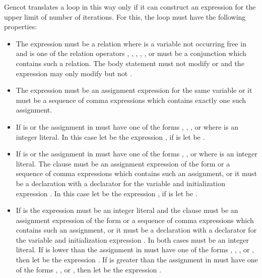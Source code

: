 Gencot translates a loop  in this way only if it can construct an expression  for the upper limit of
number of iterations. For this, the loop must have the following properties:
\begin{itemize}
\item The expression  must be a relation  where  is a variable not occurring free in 
and  is one of the relation operators \code{<}, \code{<=}, \code{>}, \code{>=}, \code{!=}, or  must be a 
conjunction which contains such a relation. The body statement  must not modify  or  and the expression 
 may only modify  but not .
\item The expression  must be an assignment expression for the same variable  or it must be a sequence of 
comma expressions which contains exactly one such assignment.
\item If  is \code{<} or \code{<=} the assignment in  must have one of the forms , ,
, or  where  is an integer literal. In this case let  be the expression ,
if  is \code{<=} let  be .
\item If  is \code{>} or \code{>=} the assignment in  must have one of the forms , ,
or  where  is an integer literal. The clause  must be an assignment expression of the form 
 or a sequence of comma expressions which contains such an assignment, or it must be a declaration with a declarator 
for the variable  and initialization expression . In this case let  be the expression ,
if  is \code{>=} let  be .
\item If  is \code{!=} the expression  must be an integer literal and the clause  must be an 
assignment expression of the form  or a sequence of comma expressions which contains such an assignment, or it 
must be a declaration with a declarator for the variable  and initialization expression . In both cases 
 must be an integer literal. If  is lower than  the assignment in  must have one of 
the forms , , , or , then let  be the expression . If 
is greater than  the assignment in  must have one of the forms , , or , 
then let  be the expression .
\end{itemize}

